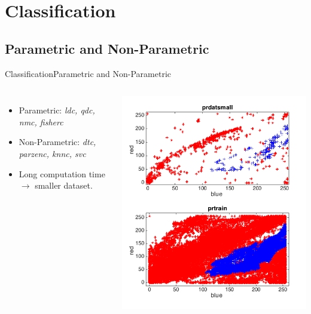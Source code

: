 \documentclass{beamer}
\begin{document}
\section{Classification}
\subsection{Parametric and Non-Parametric}
\begin{frame}{Classification}{Parametric and Non-Parametric}
    \begin{columns}
    \begin{itemize}
        \item Parametric: \emph{ldc, qdc, nmc, fisherc}
        \item Non-Parametric: \emph{dtc, parzenc, knnc, svc}
        \item Long computation time $\rightarrow$ smaller dataset.
    \end{itemize}
        \includegraphics[scale=0.3]{prdat.png}
    \end{columns}
\end{frame}
\end{document}
